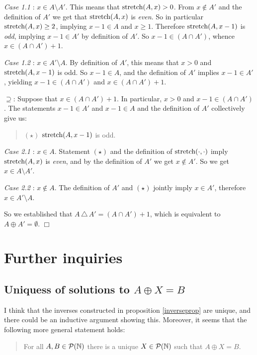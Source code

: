 \documentclass[12pt]{amsart}
\begin{document}
{\sl Case 1.1} : $x \in A \setminus A'$. This means that
$\text{stretch}(A,x) > 0$. From $x\notin A'$ and the definition
of $A'$ we get that $\text{stretch}(A,x)$ is {\em even}. So
in particular $\text{stretch}(A,x) \geq 2$, implying $x-1 \in A$ 
and $x\geq 1$. Therefore
$\text{stretch}(A, x-1)$ is {\em odd}, implying $x-1\in A'$ by
definition of $A'$. So $x-1 \in (A\cap A')$, whence $x \in (A\cap A') +1$.

{\sl Case 1.2} : $x \in A' \setminus A$. By definition of $A'$,
this means that $x > 0$ and $\text{stretch}(A, x-1)$ is odd. So
$x-1 \in A$, and the definition of $A'$ implies $x-1 \in A'$,
yielding $x-1 \in (A\cap A')$ and $x \in (A\cap A')+1$. 

$\supseteq$: Suppose that $x \in (A\cap A') + 1$. In particular,
$x > 0$ and $x-1 \in (A\cap A')$. The statements $x-1 \in A'$ and $x-1\in A$ 
and the definition of $A'$ collectively give us:

\begin{quote}
$(\star)$ \hspace*{4mm} $\text{stretch}(A,x-1)$ is odd.
\end{quote}

{\sl Case 2.1} : $x\in A$. Statement $(\star)$ and the definition of
$\text{stretch}(\cdot, \cdot)$ imply $\text{stretch}(A, x)$ is {\em even}, and by
the definition of $A'$ we get $x \notin A'$. So we get $x\in A\setminus A'$.

{\sl Case 2.2} : $x\notin A$. The definition of $A'$ and $(\star)$
jointly imply $x\in A'$, therefore $x\in A'\setminus A$.

So we established that $A \, \triangle \, A' = (A\cap A') + 1$, which
is equivalent to $A\oplus A' = \emptyset$. \hfill{$\Box$}

\section{Further inquiries}

\subsection{Uniquess of solutions to $A \oplus X = B$} I think that 
the inverses constructed in proposition \ref{inverseprop} are unique, 
and there could be an inductive argument showing this. Moreover, it seems
that the following more general statement holds:
\begin{quote} For all $A, B\in \mathcal{P}(\mathbb{N})$ there is a unique $X\in \mathcal{P}(\mathbb{N})$ such that 
$A \oplus X = B$. 
\end{quote}
\end{document}
